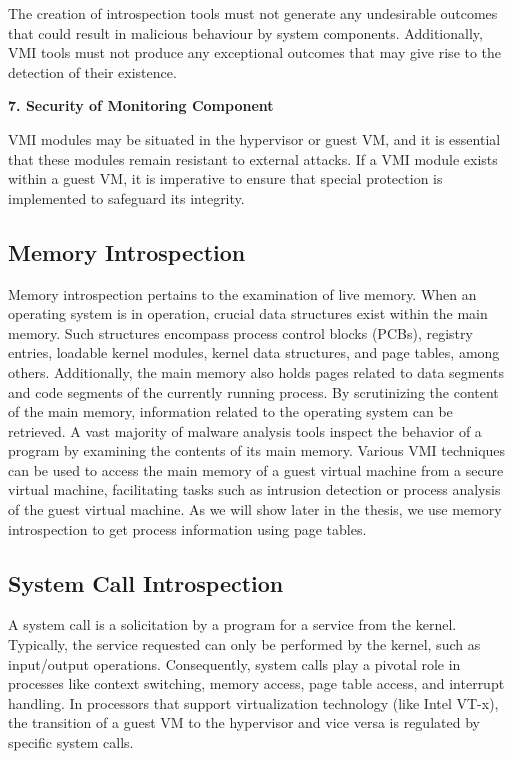 \documentclass{report}
\begin{document}
\begin{spacing}{1.5}
{\large
\noindent The creation of introspection tools must not generate any undesirable outcomes that could result in malicious behaviour by system components. Additionally, VMI tools must not produce any exceptional outcomes that may give rise to the detection of their existence.
\newline
}



{\large
\noindent \textbf{7. Security of Monitoring Component}
\leavevmode\newline
}

{\large
\noindent VMI modules may be situated in the hypervisor or guest VM, and it is essential that these modules remain resistant to external attacks. If a VMI module exists within a guest VM, it is imperative to ensure that special protection is implemented to safeguard its integrity.
\newline
}


\subsection{Memory Introspection}

{\large
Memory introspection pertains to the examination of live memory. When an operating system is in operation, crucial data structures exist within the main memory. Such structures encompass process control blocks (PCBs), registry entries, loadable kernel modules, kernel data structures, and page tables, among others. Additionally, the main memory also holds pages related to data segments and code segments of the currently running process. By scrutinizing the content of the main memory, information related to the operating system can be retrieved. A vast majority of malware analysis tools inspect the behavior of a program by examining the contents of its main memory. Various VMI techniques can be used to access the main memory of a guest virtual machine from a secure virtual machine, facilitating tasks such as intrusion detection or process analysis of the guest virtual machine. As we will show later in the thesis, we use memory introspection to get process information using page tables.
\newline
}


\subsection{System Call Introspection}

{\large
A system call is a solicitation by a program for a service from the kernel. Typically, the service requested can only be performed by the kernel, such as input/output operations. Consequently, system calls play a pivotal role in processes like context switching, memory access, page table access, and interrupt handling. In processors that support virtualization technology (like Intel VT-x), the transition of a guest VM to the hypervisor and vice versa is regulated by specific system calls.
\newline
}




\end{spacing}
\end{document}
